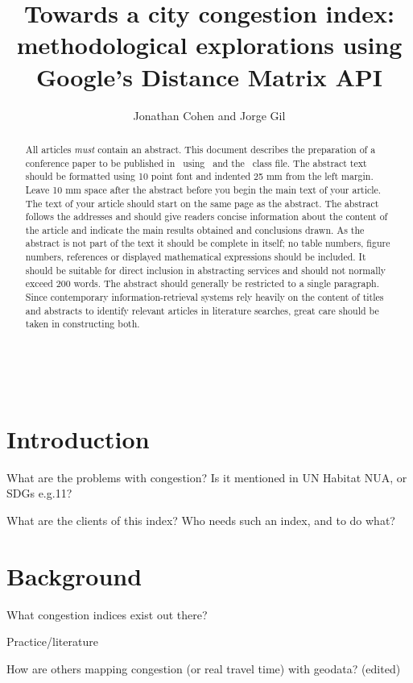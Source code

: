 \documentclass[a4paper]{jpconf}
\begin{document}
\title{Towards a city congestion index: methodological explorations using Google's Distance Matrix API}

\author{Jonathan Cohen and Jorge Gil}

\address{Chalmers University of Technology, Sven Hultins gata 6, SE-412 96, Göteborg, Sweden}





\begin{abstract}
	All articles {\it must} contain an abstract. This document describes the  preparation of a conference paper to be published in \jpcs\ using \LaTeXe\ and the \cls\ class file. The abstract text should be formatted using 10 point font and indented 25 mm from the left margin. Leave 10 mm space after the abstract before you begin the main text of your article. The text of your article should start on the same page as the abstract. The abstract follows the addresses and should give readers concise information about the content of the article and indicate the main results obtained and conclusions drawn. As the abstract is not part of the text it should be complete in itself; no table numbers, figure numbers, references or displayed mathematical expressions should be included. It should be suitable for direct inclusion in abstracting services and should not normally exceed 200 words. The abstract should generally be restricted to a single paragraph. Since contemporary information-retrieval systems rely heavily on the content of titles and abstracts to identify relevant articles in literature searches, great care should be taken in constructing both.
\end{abstract}

\

\section{Introduction}
\indent What are the problems with congestion? Is it mentioned in UN Habitat NUA, or SDGs e.g.11?\par
\indent What are the clients of this index? Who needs such an index, and to do what?\par

\section{Background}
\indent What congestion indices exist out there? \par
\indent Practice/literature\par
\indent How are others mapping congestion (or real travel time) with geodata? (edited) \par
\end{document}
